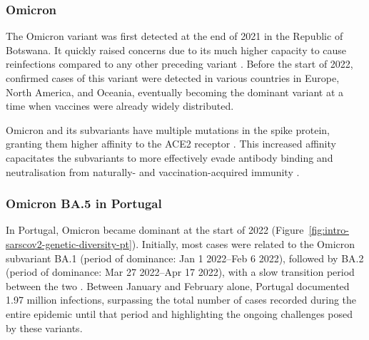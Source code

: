 \subsubsection{Omicron}

The Omicron variant was first detected at the end of 2021 in the Republic of Botswana.
It quickly raised concerns due to its much higher capacity to cause reinfections compared to any other preceding variant \citep{pulliam2022IncreasedRisk}.
Before the start of 2022, confirmed cases of this variant were detected in various countries in Europe, North America, and Oceania, eventually becoming the dominant variant at a time when vaccines were already widely distributed.

Omicron and its subvariants have multiple mutations in the spike protein, granting them higher affinity to the ACE2 receptor \citep{starr2020DeepMutational}.
This increased affinity capacitates the subvariants to more effectively evade antibody binding and neutralisation from naturally- and vaccination-acquired immunity \citep{arora2022AugmentedNeutralisation, greaney2021CompleteMapping}.


\subsubsection{Omicron BA.5 in Portugal}

In Portugal, Omicron became dominant at the start of 2022 (Figure~\ref{fig:intro-sarscov2-genetic-diversity-pt}).
Initially, most cases were related to the Omicron subvariant BA.1 (period of dominance: Jan 1 2022--Feb 6 2022), followed by BA.2 (period of dominance: Mar 27 2022--Apr 17 2022), with a slow transition period between the two \citep{malatoRiskBAInfection2022}.
Between January and February alone, Portugal documented 1.97 million infections, surpassing the total number of cases recorded during the entire epidemic until that period and highlighting the ongoing challenges posed by these variants.

